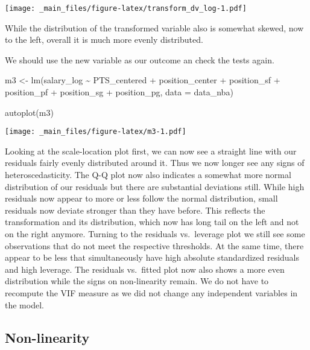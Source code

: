 \documentclass[
]{book}
\newenvironment{Shaded}{\begin{snugshade}}{\end{snugshade}}
\newcommand{\AttributeTok}[1]{\textcolor[rgb]{0.77,0.63,0.00}{#1}}
\newcommand{\AttributeTok}[1]{\textcolor[rgb]{0.13,0.29,0.53}{#1}}
\newcommand{\FunctionTok}[1]{\textcolor[rgb]{0.00,0.00,0.00}{#1}}
\newcommand{\FunctionTok}[1]{\textcolor[rgb]{0.13,0.29,0.53}{\textbf{#1}}}
\newcommand{\NormalTok}[1]{#1}
\newcommand{\OtherTok}[1]{\textcolor[rgb]{0.56,0.35,0.01}{#1}}
\newcommand{\SpecialCharTok}[1]{\textcolor[rgb]{0.00,0.00,0.00}{#1}}
\newcommand{\SpecialCharTok}[1]{\textcolor[rgb]{0.81,0.36,0.00}{\textbf{#1}}}
\begin{document}
\texttt{[image: \_main\_files/figure-latex/transform\_dv\_log-1.pdf]}

While the distribution of the transformed variable also is somewhat skewed, now
to the left, overall it is much more evenly distributed.

We should use the new variable as our outcome an check the tests again.

\begin{Shaded}
\begin{Highlighting}[]
\NormalTok{m3 }\OtherTok{\textless{}{-}} \FunctionTok{lm}\NormalTok{(salary\_log }\SpecialCharTok{\textasciitilde{}}\NormalTok{ PTS\_centered }\SpecialCharTok{+}\NormalTok{ position\_center }\SpecialCharTok{+}\NormalTok{ position\_sf }\SpecialCharTok{+}\NormalTok{  position\_pf }\SpecialCharTok{+}\NormalTok{ position\_sg }\SpecialCharTok{+}\NormalTok{ position\_pg, }\AttributeTok{data =}\NormalTok{ data\_nba)}

\FunctionTok{autoplot}\NormalTok{(m3)}
\end{Highlighting}
\end{Shaded}

\texttt{[image: \_main\_files/figure-latex/m3-1.pdf]}

Looking at the scale-location plot first, we can now see a straight line with
our residuals fairly evenly distributed around it. Thus we now longer see any
signs of heteroscedasticity. The Q-Q plot now also indicates a somewhat more
normal distribution of our residuals but there are substantial deviations still.
While high residuals now appear to more or less follow the normal distribution,
small residuals now deviate stronger than they have before. This reflects the
transformation and its distribution, which now has long tail on the left and not
on the right anymore. Turning to the residuals vs.~leverage plot we still see
some observations that do not meet the respective thresholds. At the same time,
there appear to be less that simultaneously have high absolute standardized
residuals and high leverage. The residuals vs.~fitted plot now also shows a more
even distribution while the signs on non-linearity remain. We do not have to
recompute the VIF measure as we did not change any independent variables in the
model.

\hypertarget{non-linearity}{%
\subsection{Non-linearity}\label{non-linearity}}
\end{document}
